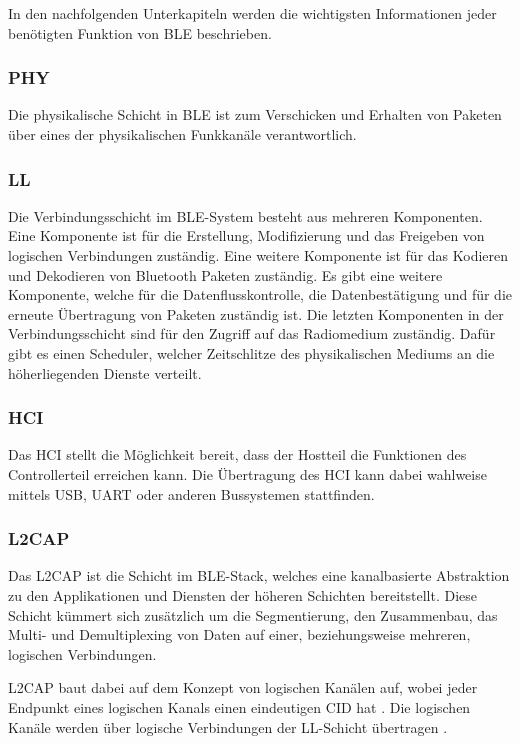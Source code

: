 In den nachfolgenden Unterkapiteln werden die wichtigsten Informationen jeder benötigten Funktion von \ac{BLE} beschrieben.

\subsubsection{\acf{PHY}}
Die physikalische Schicht in \ac{BLE} ist zum Verschicken und Erhalten von Paketen über eines der physikalischen Funkkanäle verantwortlich. \cite[S.~209]{bluetoothCore}

\subsubsection{\acf{LL}}
Die Verbindungsschicht im \ac{BLE}-System besteht aus mehreren Komponenten. Eine Komponente ist für die Erstellung, Modifizierung und das Freigeben von logischen Verbindungen zuständig. Eine weitere Komponente ist für das Kodieren und Dekodieren von Bluetooth Paketen zuständig. Es gibt eine weitere Komponente, welche für die Datenflusskontrolle, die Datenbestätigung und für die erneute Übertragung von Paketen zuständig ist. Die letzten Komponenten in der Verbindungsschicht sind für den Zugriff auf das Radiomedium zuständig. Dafür gibt es einen Scheduler, welcher Zeitschlitze des physikalischen Mediums an die höherliegenden Dienste verteilt. \cite[S.~207f.]{bluetoothCore}

\subsubsection{\acf{HCI}}
Das \acl{HCI} stellt die Möglichkeit bereit, dass der Hostteil die Funktionen des Controllerteil erreichen kann. Die Übertragung des \ac{HCI} kann dabei wahlweise mittels USB, UART oder anderen Bussystemen stattfinden. \cite[S.~1735f.]{bluetoothCore}

\subsubsection{\acf{L2CAP}}
Das \acl{L2CAP} ist die Schicht im \ac{BLE}-Stack, welches eine kanalbasierte Abstraktion zu den Applikationen und Diensten der höheren Schichten bereitstellt. Diese Schicht kümmert sich zusätzlich um die Segmentierung, den Zusammenbau, das Multi- und Demultiplexing von Daten auf einer, beziehungsweise mehreren, logischen Verbindungen. \cite[S.~195, S.~1013]{bluetoothCore}

\acl{L2CAP} baut dabei auf dem Konzept von logischen Kanälen auf, wobei jeder Endpunkt eines logischen Kanals einen eindeutigen \ac{CID} hat \cite[S.~1021]{bluetoothCore}. Die logischen Kanäle werden über logische Verbindungen der \ac{LL}-Schicht übertragen \cite[S.~1013]{bluetoothCore}.

